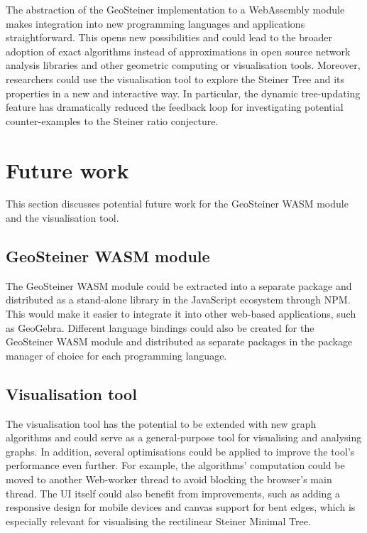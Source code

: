 \documentclass{l4proj}
\begin{document}
The abstraction of the GeoSteiner implementation to a WebAssembly module makes integration into new programming languages and applications straightforward. This opens new possibilities and could lead to the broader adoption of exact algorithms instead of approximations in open source network analysis libraries and other geometric computing or visualisation tools.
Moreover, researchers could use the visualisation tool to explore the Steiner Tree and its properties in a new and interactive way. In particular, the dynamic tree-updating feature has dramatically reduced the feedback loop for investigating potential counter-examples to the Steiner ratio conjecture.

\section{Future work}
This section discusses potential future work for the GeoSteiner WASM module and the visualisation tool.

\subsection{GeoSteiner WASM module}
The GeoSteiner WASM module could be extracted into a separate package and distributed as a stand-alone library in the JavaScript ecosystem through NPM. This would make it easier to integrate it into other web-based applications, such as GeoGebra. Different language bindings could also be created for the GeoSteiner WASM module and distributed as separate packages in the package manager of choice for each programming language.

\subsection{Visualisation tool}
The visualisation tool has the potential to be extended with new graph algorithms and could serve as a general-purpose tool for visualising and analysing graphs.
In addition, several optimisations could be applied to improve the tool's performance even further. For example, the algorithms' computation could be moved to another Web-worker thread to avoid blocking the browser's main thread.
The UI itself could also benefit from improvements, such as adding a responsive design for mobile devices and canvas support for bent edges, which is especially relevant for visualising the rectilinear Steiner Minimal Tree.
\end{document}

